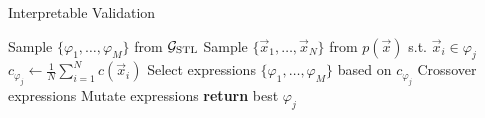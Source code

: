 \begin{algorithm}
\caption{Interpretable Validation} \label{alg:interpretable}
\begin{algorithmic}[1]
    \State Sample $\{ \varphi_1, \ldots, \varphi_M \}$ from $\mathcal{G}_{\rm STL}$ \label{line:if_sample_grammar}
    \Loop
            \State Sample $\{\vec{x}_1, \ldots, \vec{x}_N \}$ from $p(\vec{x})$ s.t. $\vec{x}_i \in \varphi_j$\label{line:if_sample_spec}
            \State $c_{\varphi_j} \gets \frac{1}{N} \sum_{i=1}^N  c(\vec{x}_i)$ \label{line:if_compute_avg}
        \EndFor
        \State Select expressions $\{ \varphi_1, \ldots, \varphi_M \}$ based on $c_{\varphi_j}$\label{line:if_selection}
        \State Crossover expressions
        \State Mutate expressions \label{line:if_mutation}
    \EndLoop
    \State \textbf{return} best $\varphi_j$ \label{line:if_return}
    \EndFunction
\end{algorithmic}
\end{algorithm}

